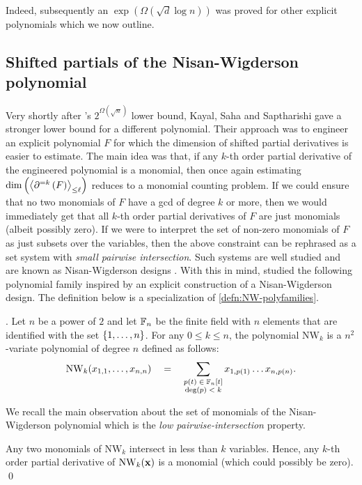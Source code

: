 Indeed, subsequently an $\exp(\Omega(\sqrt{d}\log n))$ was proved \cite{KSS13,FLMS13} for other explicit polynomials  which we now outline. 

\subsection{Shifted partials of the Nisan-Wigderson polynomial}

Very shortly after \cite{gkks13}'s $2^{\Omega(\sqrt{n})}$ lower bound, Kayal, Saha and Saptharishi \cite{KSS13} gave a stronger lower bound for a different polynomial. 
Their approach was to engineer an explicit polynomial $F$ for which the dimension of shifted partial derivatives is easier to estimate. 
The main idea was that, if any $k$-th order partial derivative of the engineered polynomial is a monomial, then once again estimating $\dim\left(\left\langle\partial^{=k}\left(F\right)\right\rangle_{\leq \ell}\right)$ reduces to a monomial counting problem. 
If we could ensure that no two monomials of $F$ have a gcd of degree $k$ or more, then we would immediately get that all $k$-th order partial derivatives of $F$ are just monomials (albeit possibly zero). 
If we were to interpret the set of non-zero monomials of $F$ as just subsets over the variables, then the above constraint can be rephrased as a set system with \emph{small pairwise intersection}. 
Such systems are well studied and are known as Nisan-Wigderson designs \cite{nw94}. 
With this in mind, \cite{KSS13} studied the following polynomial family inspired by an explicit construction of a Nisan-Wigderson design. 
The definition below is a specialization of \autoref{defn:NW-polyfamilies}. 

\begin{definition}. 
Let $n$ be a power of $2$ and let $\mathbb{F}_n$ be the finite field with $n$ elements that are identified with the set $\left\{1,\dots, n\right\}$. 
For any $0\leq k \leq n$, the polynomial $\mathrm{NW}_k$ is a $n^2$-variate polynomial of degree $n$ defined as follows:
$$
\mathrm{NW}_k(x_{1,1},\dots, x_{n,n}) \quad = \quad \sum_{\substack{p(t) \;\in\; \mathbb{F}_n[t]\\\deg(p) \;<\; k}} x_{1,p(1)}\dots x_{n,p(n)}.
$$
\end{definition}

We recall the main observation about the set of monomials of the Nisan-Wigderson polynomial which is the \emph{low pairwise-intersection} property. 

\begin{observation}
Any two monomials of $\mathrm{NW}_k$ intersect in less than $k$ variables. 
Hence, any $k$-th order partial derivative of $\mathrm{NW}_k(\mathbf{x})$ is a monomial (which could possibly be zero). \qed
\end{observation}

